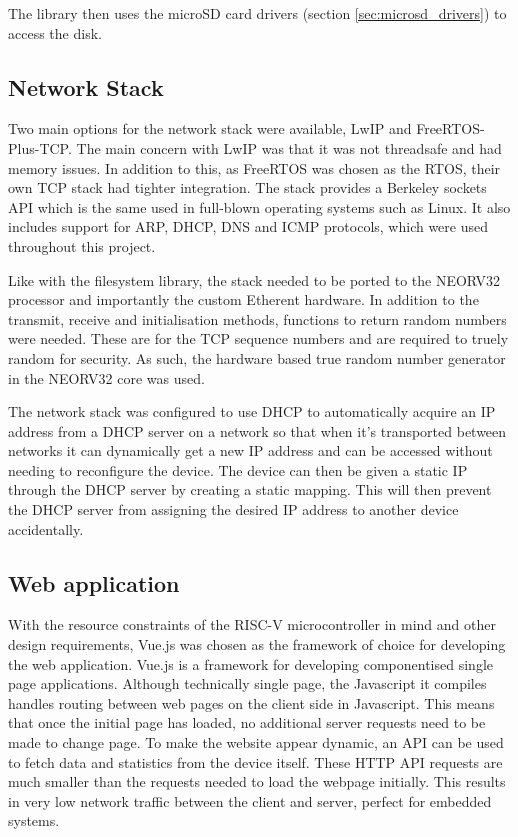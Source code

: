The library then uses the microSD card drivers (section \ref{sec:microsd_drivers}) to access the disk. 


\subsection{Network Stack}
\label{sec:freertos_tcpip_stack}

Two main options for the network stack were available, LwIP and FreeRTOS-Plus-TCP. The main concern with LwIP was that it was not threadsafe and had memory issues. In addition to this, as FreeRTOS was chosen as the RTOS, their own TCP stack had tighter integration. The stack provides a Berkeley sockets API which is the same used in full-blown operating systems such as Linux. It also includes support for ARP, DHCP, DNS and ICMP protocols, which were used throughout this project. 

Like with the filesystem library, the stack needed to be ported to the NEORV32 processor and importantly the custom Etherent hardware. In addition to the transmit, receive and initialisation methods, functions to return random numbers were needed. These are for the TCP sequence numbers and are required to truely random for security. As such, the hardware based true random number generator in the NEORV32 core was used. 

The network stack was configured to use DHCP to automatically acquire an IP address from a DHCP server on a network so that when it's transported between networks it can dynamically get a new IP address and can be accessed without needing to reconfigure the device. The device can then be given a static IP through the DHCP server by creating a static mapping. This will then prevent the DHCP server from assigning the desired IP address to another device accidentally. 

\subsection{Web application}
With the resource constraints of the RISC-V microcontroller in mind and other design requirements, Vue.js was chosen as the framework of choice for developing the web application. Vue.js is a framework for developing componentised single page applications. Although technically single page, the Javascript it compiles handles routing between web pages on the client side in Javascript. This means that once the initial page has loaded, no additional server requests need to be made to change page. To make the website appear dynamic, an API can be used to fetch data and statistics from the device itself. These HTTP API requests are much smaller than the requests needed to load the webpage initially. This results in very low network traffic between the client and server, perfect for embedded systems. 

